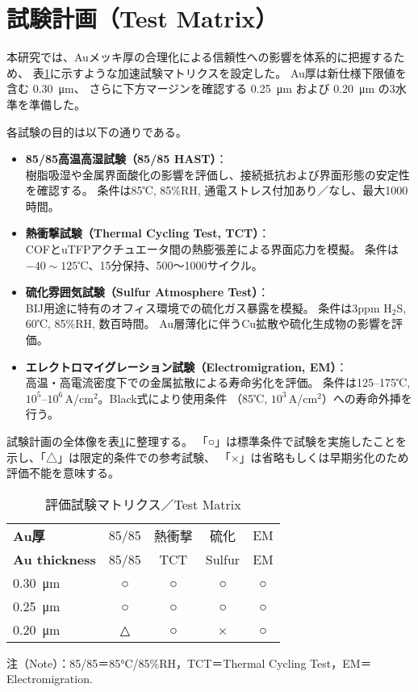 \documentclass[conference]{IEEEtran}
\begin{document}
\section{試験計画（Test Matrix）}

本研究では、Auメッキ厚の合理化による信頼性への影響を体系的に把握するため、
表\ref{tab:test-matrix}に示すような加速試験マトリクスを設定した。
Au厚は新仕様下限値を含む \SI{0.30}{\micro\meter}、
さらに下方マージンを確認する \SI{0.25}{\micro\meter} および \SI{0.20}{\micro\meter} の3水準を準備した。

各試験の目的は以下の通りである。
\begin{itemize}
  \item \textbf{85/85高温高湿試験（85/85 HAST）}：\\
  樹脂吸湿や金属界面酸化の影響を評価し、接続抵抗および界面形態の安定性を確認する。
  条件は85℃, 85\%RH, 通電ストレス付加あり／なし、最大1000時間。
  \item \textbf{熱衝撃試験（Thermal Cycling Test, TCT）}：\\
  COFとuTFPアクチュエータ間の熱膨張差による界面応力を模擬。
  条件は $-40 \sim 125$℃、15分保持、500～1000サイクル。
  \item \textbf{硫化雰囲気試験（Sulfur Atmosphere Test）}：\\
  BIJ用途に特有のオフィス環境での硫化ガス暴露を模擬。
  条件は3ppm H$_2$S, 60℃, 85\%RH, 数百時間。
  Au層薄化に伴うCu拡散や硫化生成物の影響を評価。
  \item \textbf{エレクトロマイグレーション試験（Electromigration, EM）}：\\
  高温・高電流密度下での金属拡散による寿命劣化を評価。
  条件は125--175℃, $10^5$--$10^6$\,A/cm$^2$。Black式により使用条件
  （85℃, $10^3$\,A/cm$^2$）への寿命外挿を行う。
\end{itemize}

試験計画の全体像を表\ref{tab:test-matrix}に整理する。
「○」は標準条件で試験を実施したことを示し、「△」は限定的条件での参考試験、
「×」は省略もしくは早期劣化のため評価不能を意味する。

\begin{table}[htbp]
  \centering
  \caption{評価試験マトリクス／Test Matrix}
  \label{tab:test-matrix}
  \begin{tabular}{@{}lcccc@{}}
    \toprule
    \textbf{Au厚} & 85/85 & 熱衝撃 & 硫化 & EM \\
    \textbf{Au thickness} & 85/85 & TCT & Sulfur & EM \\
    \midrule
    \SI{0.30}{\micro\meter} & ○ & ○ & ○ & ○ \\
    \SI{0.25}{\micro\meter} & ○ & ○ & ○ & ○ \\
    \SI{0.20}{\micro\meter} & △ & ○ & × & ○ \\
    \bottomrule
  \end{tabular}
  \vspace{2pt}
  \footnotesize{注（Note）：85/85＝85\si{\celsius}/85\%RH，TCT＝Thermal Cycling Test，EM＝Electromigration.}
\end{table}
\end{document}
